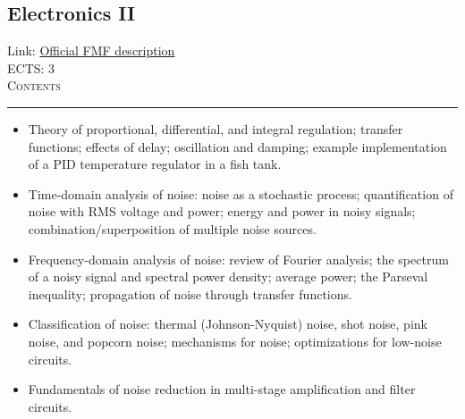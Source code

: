 \documentclass[11pt, a4paper]{article}
\newenvironment{course}[3]{
\subsection{#1}%
Link: \href{#2}{Official FMF description}\\%
ECTS: #3%
\vspace{1ex}
\\
{\large \textsc{Contents}}\\[-0.9ex]%
\rule{\textwidth}{0.5pt}
\vspace{-3ex}
}
{}
\newenvironment{chapter}[1]{
\begin{tcolorbox}[title=#1, breakable]
}
{\end{tcolorbox}}
\begin{document}
\begin{course}{Electronics II}{https://www.fmf.uni-lj.si/en/study-physics/programmes/1fiz/2020/7000777/courses/1135/}{3}
\begin{chapter}{Fundamentals of electronic regulation}
\begin{itemize}
            \item Theory of proportional, differential, and integral regulation; transfer functions; effects of delay; oscillation and damping; example implementation of a PID temperature regulator in a fish tank.
        
        \end{itemize}
    \end{chapter}

    \begin{chapter}{Fundamentals of noise}
        \begin{itemize}
        
            \item Time-domain analysis of noise: noise as a stochastic process; quantification of noise with RMS voltage and power; energy and power in noisy signals; combination/superposition of multiple noise sources.

            \item Frequency-domain analysis of noise: review of Fourier analysis; the spectrum of a noisy signal and spectral power density; average power; the Parseval inequality; propagation of noise through transfer functions.

            \item Classification of noise: thermal (Johnson-Nyquist) noise, shot noise, pink noise, and popcorn noise; mechanisms for noise; optimizations for low-noise circuits.

            \item Fundamentals of noise reduction in multi-stage amplification and filter circuits.
        
        \end{itemize}
    \end{chapter}

\end{course}
\end{document}
